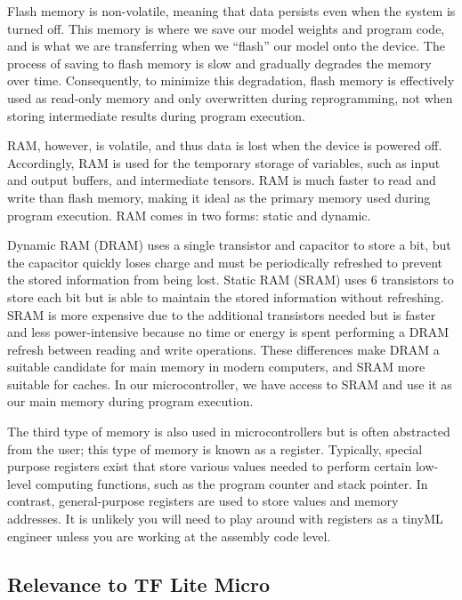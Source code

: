     Flash memory is non-volatile, meaning that data persists even when the system is turned off. This memory is where we save our model weights and program code, and is what we are transferring when we “flash” our model onto the device. The process of saving to flash memory is slow and gradually degrades the memory over time. Consequently, to minimize this degradation, flash memory is effectively used as read-only memory and only overwritten during reprogramming, not when storing intermediate results during program execution.
    
    RAM, however, is volatile, and thus data is lost when the device is powered off. Accordingly, RAM is used for the temporary storage of variables, such as input and output buffers, and intermediate tensors. RAM is much faster to read and write than flash memory, making it ideal as the primary memory used during program execution. RAM comes in two forms: static and dynamic.
    
    Dynamic RAM (DRAM) uses a single transistor and capacitor to store a bit, but the capacitor quickly loses charge and must be periodically refreshed to prevent the stored information from being lost. Static RAM (SRAM) uses 6 transistors to store each bit but is able to maintain the stored information without refreshing. SRAM is more expensive due to the additional transistors needed but is faster and less power-intensive because no time or energy is spent performing a DRAM refresh between reading and write operations. These differences make DRAM a suitable candidate for main memory in modern computers, and SRAM more suitable for caches. In our microcontroller, we have access to SRAM and use it as our main memory during program execution.
    
    The third type of memory is also used in microcontrollers but is often abstracted from the user; this type of memory is known as a register. Typically, special purpose registers exist that store various values needed to perform certain low-level computing functions, such as the program counter and stack pointer. In contrast, general-purpose registers are used to store values and memory addresses. It is unlikely you will need to play around with registers as a tinyML engineer unless you are working at the assembly code level.
    
\subsection{Relevance to TF Lite Micro}

